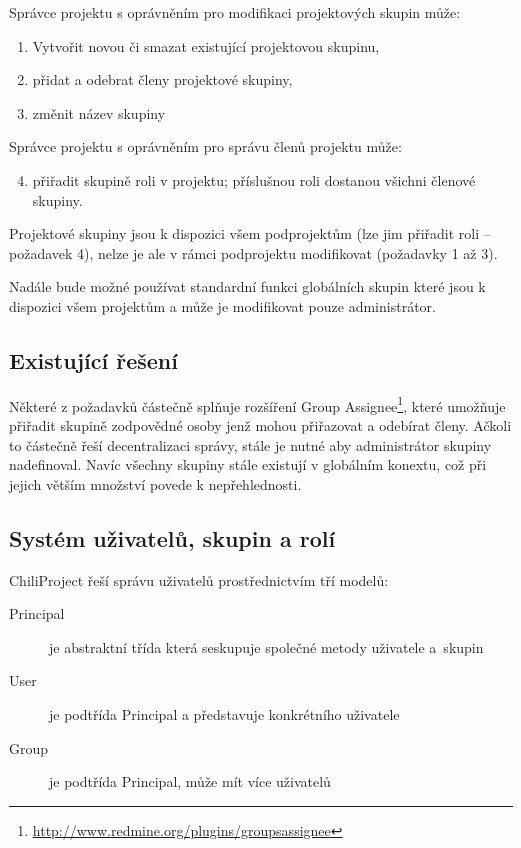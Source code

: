 \documentclass[thesis=B,czech]{FITthesis}[2012/05/02]
\begin{document}
Správce projektu s oprávněním pro modifikaci projektových skupin může:

\begin{enumerate}[1.]
\item
  Vytvořit novou či smazat existující projektovou skupinu,
\item
  přidat a odebrat členy projektové skupiny,
\item
  změnit název skupiny
\end{enumerate}
Správce projektu s oprávněním pro správu členů projektu může:

\begin{enumerate}[1.]
\setcounter{enumi}{3}
\item
  přiřadit skupině roli v projektu; příslušnou roli dostanou všichni
  členové skupiny.
\end{enumerate}
Projektové skupiny jsou k dispozici všem podprojektům (lze jim přiřadit
roli -- požadavek 4), nelze je ale v rámci podprojektu modifikovat
(požadavky 1 až 3).

Nadále bude možné používat standardní funkci globálních skupin které
jsou k dispozici všem projektům a může je modifikovat pouze
administrátor.

\subsection{Existující řešení}

Některé z požadavků částečně splňuje rozšíření Group Assignee\footnote{\url{http://www.redmine.org/plugins/groupsassignee}},
které umožňuje přiřadit skupině zodpovědné osoby jenž mohou přiřazovat a
odebírat členy. Ačkoli to částečně řeší decentralizaci správy, stále je
nutné aby administrátor skupiny nadefinoval. Navíc všechny skupiny stále
existují v globálním konextu, což při jejich větším množství povede
k nepřehlednosti.

\subsection{Systém uživatelů, skupin a rolí}

\label{sec:proj_group_sys}

ChiliProject řeší správu uživatelů prostřednictvím tří modelů:

\begin{description}
\item[Principal] je abstraktní třída která seskupuje společné metody
  uživatele \mbox{a skupin}
\item[User] je podtřída Principal a představuje konkrétního
  uživatele
\item[Group] je podtřída Principal, může mít více uživatelů
\end{description}
\end{document}
